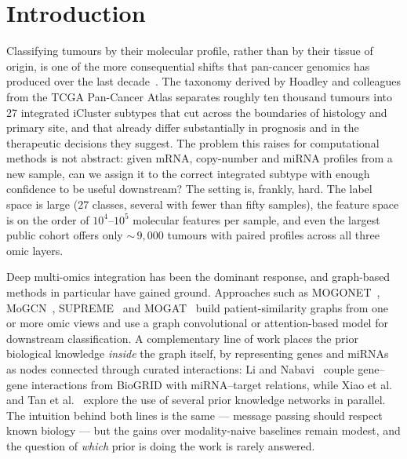 \documentclass[review,3p,times,11pt, ]{elsarticle} %
\begin{document}
\section{Introduction}
\label{sec:introduction}

Classifying tumours by their molecular profile, rather than by their tissue of origin, is one of the more consequential shifts that pan-cancer genomics has produced over the last decade~\cite{weinstein2013tcga_pancancer,Hoadley2018CellOfOriginPanCan}. The taxonomy derived by Hoadley and colleagues from the TCGA Pan-Cancer Atlas separates roughly ten thousand tumours into 27 integrated iCluster subtypes that cut across the boundaries of histology and primary site, and that already differ substantially in prognosis and in the therapeutic decisions they suggest. The problem this raises for computational methods is not abstract: given mRNA, copy-number and miRNA profiles from a new sample, can we assign it to the correct integrated subtype with enough confidence to be useful downstream? The setting is, frankly, hard. The label space is large (27 classes, several with fewer than fifty samples), the feature space is on the order of $10^4$--$10^5$ molecular features per sample, and even the largest public cohort offers only $\sim$\,$9{,}000$ tumours with paired profiles across all three omic layers.

Deep multi-omics integration has been the dominant response, and graph-based methods in particular have gained ground. Approaches such as MOGONET~\cite{wang_mogonet_2021}, MoGCN~\cite{li_mogcn_2022}, SUPREME~\cite{kesimoglu_supreme_2022} and MOGAT~\cite{tanvir_mogat_2024} build patient-similarity graphs from one or more omic views and use a graph convolutional or attention-based model for downstream classification. A complementary line of work places the prior biological knowledge \emph{inside} the graph itself, by representing genes and miRNAs as nodes connected through curated interactions: Li and Nabavi~\cite{li_multimodal_2024} couple gene--gene interactions from BioGRID with miRNA--target relations, while Xiao et al.~\cite{xiao_graph_2023} and Tan et al.~\cite{tan_amogel_2025} explore the use of several prior knowledge networks in parallel. The intuition behind both lines is the same — message passing should respect known biology — but the gains over modality-naive baselines remain modest, and the question of \emph{which} prior is doing the work is rarely answered.
\end{document}

